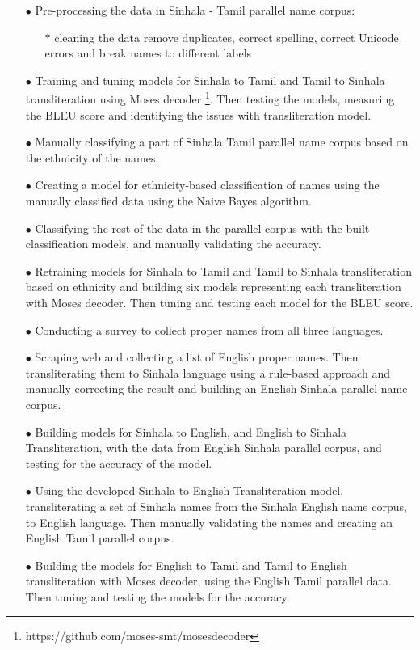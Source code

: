 \documentclass[10pt, a4paper, conference, compsocconf]{IEEEtran}
\begin{document}
\begin{itemize}
  \item[$\bullet$] Pre-processing the data in Sinhala - Tamil parallel name corpus:
  \begin{itemize}
  \item[$\ast$] cleaning the data remove duplicates, correct spelling, correct Unicode errors and break names to different labels
  \end{itemize}	
  \item[$\bullet$] Training and tuning models for Sinhala to Tamil and Tamil to Sinhala transliteration using Moses decoder \footnote{https://github.com/moses-smt/mosesdecoder}. Then testing the models, measuring the BLEU score and identifying the issues with transliteration model.
   \item[$\bullet$] Manually classifying a part of Sinhala Tamil parallel name corpus based on the ethnicity of the names.
   \item[$\bullet$]Creating a model for ethnicity-based classification of names using the manually classified data using the Naive Bayes algorithm.
   \item[$\bullet$] Classifying the rest of the data in the parallel corpus with the built classification models, and manually validating the accuracy.
   \item[$\bullet$]Retraining models for Sinhala to Tamil and Tamil to Sinhala transliteration based on ethnicity and building six models representing each transliteration with Moses decoder. Then tuning and testing each model for the BLEU score.
   \item[$\bullet$]Conducting a survey to collect proper names from all three languages.
   \item[$\bullet$]Scraping web and collecting a list of English proper names. Then transliterating them to Sinhala language using a rule-based approach and manually correcting the result and building an English Sinhala parallel name corpus.
   \item[$\bullet$]Building models for Sinhala to English, and English to Sinhala Transliteration, with the data from English Sinhala parallel corpus, and testing for the accuracy of the model.
   \item[$\bullet$]Using the developed Sinhala to English Transliteration model, transliterating a set of Sinhala names from the Sinhala English name corpus, to English language. Then manually validating the names and creating an English Tamil parallel corpus.
   \item[$\bullet$]Building the models for English to Tamil and Tamil to English transliteration with Moses decoder, using the English Tamil parallel data. Then tuning and testing the models for the accuracy.
   
\end{itemize}
\end{document}
